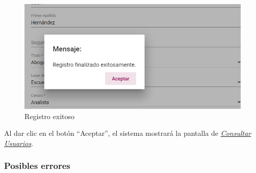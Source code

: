 
             \begin{figure}[!hbtp]
            	\centering
            \includegraphics[width=0.4\linewidth]{images/SP5/MSG5}
            	\caption{Registro exitoso}
            	\label{mensaje5}

            \end{figure}

            Al dar clic en el botón “Aceptar”, el sistema mostrará la pantalla de  \hyperlink{consultarUs}{\textit{Consultar Usuarios}}.

            \subsubsection{Posibles errores}

